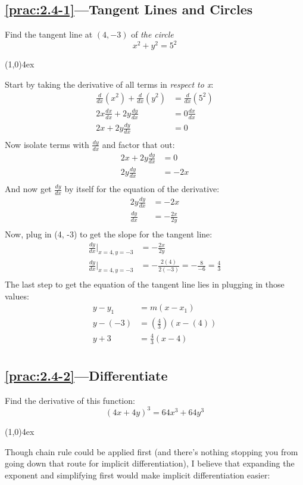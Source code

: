 \documentclass{MathNotes}
\newcommand{\br}{
\begin{center}
\line(1,0){4ex}
\end{center}}
\begin{document}
\subsection*{\ref{prac:2.4-1}---Tangent Lines and Circles}\label{ans:2.4-1}
Find the tangent line at $(4,-3)$ of \textit{the circle}
$$x^2+y^2=5^2$$
\br
Start by taking the derivative of all terms in \textit{respect to x}:
\begin{align*}
    \frac{d}{dx}(x^2)+\frac{d}{dx}(y^2)&=\frac{d}{dx}(5^2)\\
    2x\frac{dx}{dx}+2y\frac{dy}{dx}&=0\frac{dx}{dx}\\
    2x+2y\frac{dy}{dx}&=0\\
\end{align*}
Now isolate terms with $\frac{dy}{dx}$ and factor that out:
\begin{align*}
    2x+2y\frac{dy}{dx}&=0\\
    2y\frac{dy}{dx}&=-2x\\
\end{align*}
And now get $\frac{dy}{dx}$ by itself for the equation of the derivative:
\begin{align*}
    2y\frac{dy}{dx}&=-2x\\
    \frac{dy}{dx}&=-\frac{2x}{2y}\\
\end{align*}
Now, plug in (4, -3) to get the slope for the tangent line:
\begin{align*}
    \frac{dy}{dx}\Big|_{x=4,y=-3}&=-\frac{2x}{2y}\\
    \frac{dy}{dx}\Big|_{x=4,y=-3}&=-\frac{2(4)}{2(-3)}=-\frac{8}{-6}=\frac{4}{3}\\
\end{align*}
The last step to get the equation of the tangent line lies in plugging in those
values:
\begin{align*}
    y-y_1&=m(x-x_1)\\
    y-(-3)&=(\frac{4}{3})(x-(4))\\
    y+3&=\frac{4}{3}(x-4)\\
\end{align*}

\newpage
\subsection*{\ref{prac:2.4-2}---Differentiate}\label{ans:2.4-2}
Find the derivative of this function: $$(4x+4y)^3=64x^3+64y^3$$
\br
Though chain rule could be applied first (and there's nothing stopping you from
going down that route for implicit differentiation), I believe that expanding
the exponent and simplifying first would make implicit differentiation easier:
\end{document}
